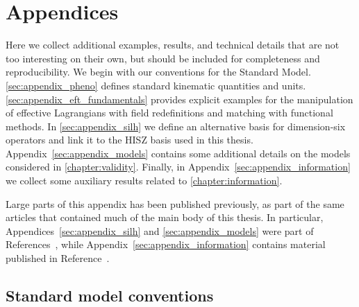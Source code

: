 



\chapter{Appendices}

Here we collect additional examples, results, and technical details
that are not too interesting on their own, but should be included for
completeness and reproducibility. We begin with our conventions for
the Standard Model. \autoref{sec:appendix_pheno} defines standard
kinematic quantities and
units. \autoref{sec:appendix_eft_fundamentals} provides explicit
examples for the manipulation of effective Lagrangians with field
redefinitions and matching with functional methods. In
\autoref{sec:appendix_silh} we define an alternative basis for
dimension-six operators and link it to the HISZ basis used in this
thesis. Appendix~\ref{sec:appendix_models} contains some additional
details on the models considered in
\autoref{chapter:validity}. Finally, in
Appendix~\ref{sec:appendix_information} we collect some auxiliary
results related to \autoref{chapter:information}.

Large parts of this appendix has been published previously, as part of
the same articles that contained much of the main body of this
thesis. In particular, Appendices~\ref{sec:appendix_silh} and
\ref{sec:appendix_models} were part of
References~\cite{Brehmer:2015rna, Biekotter:2016ecg}, while
Appendix~\ref{sec:appendix_information} contains material published in
Reference~\cite{Brehmer:2016nyr}.



\section{Standard model conventions}
\label{sec:appendix_sm}

